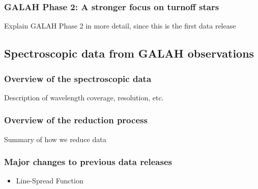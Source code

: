 \documentclass[
  journal=pasa,
  manuscript=research-paper, %
  year=2021,
  volume=37
]{cup-journal}
\begin{document}
\subsubsection{GALAH Phase 2: A stronger focus on turnoff stars}

Explain GALAH Phase 2 in more detail, since this is the first data release

\subsection{Spectroscopic data from GALAH observations}
\label{sec:spectroscopic_data_from_galah_observations}

\subsubsection{Overview of the spectroscopic data} \label{sec:overview_spectroscopic_data}

Description of wavelength coverage, resolution, etc.

\subsubsection{Overview of the reduction process}

Summary of how we reduce data

\subsubsection{Major changes to previous data releases} \label{sec:major_changes_to_previous_data_releases}

\begin{itemize}
    \item Line-Spread Function
\end{itemize}

\end{document}

